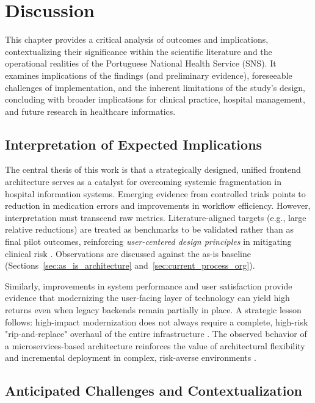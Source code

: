 \chapter{Discussion}
\label{chap:ProblemAndChallenges}

This chapter provides a critical analysis of outcomes and implications, contextualizing their significance within the scientific literature and the operational realities of the Portuguese National Health Service (SNS). It examines implications of the findings (and preliminary evidence), foreseeable challenges of implementation, and the inherent limitations of the study's design, concluding with broader implications for clinical practice, hospital management, and future research in healthcare informatics.

\section{Interpretation of Expected Implications}

The central thesis of this work is that a strategically designed, unified frontend architecture serves as a catalyst for overcoming systemic fragmentation in hospital information systems. Emerging evidence from controlled trials points to reduction in medication errors and improvements in workflow efficiency. However, interpretation must transcend raw metrics. Literature-aligned targets (e.g., large relative reductions) are treated as benchmarks to be validated rather than as final pilot outcomes, reinforcing \textit{user-centered design principles} in mitigating clinical risk \cite{ciapponi2021,radley2013}. Observations are discussed against the as-is baseline (Sections~\ref{sec:as_is_architecture} and~\ref{sec:current_process_org}).

Similarly, improvements in system performance and user satisfaction provide evidence that modernizing the user-facing layer of technology can yield high returns even when legacy backends remain partially in place. A strategic lesson follows: high-impact modernization does not always require a complete, high-risk "rip-and-replace" overhaul of the entire infrastructure \cite{adler2021}. The observed behavior of a microservices-based architecture reinforces the value of architectural flexibility and incremental deployment in complex, risk-averse environments \cite{newman2021}.

\section{Anticipated Challenges and Contextualization}

